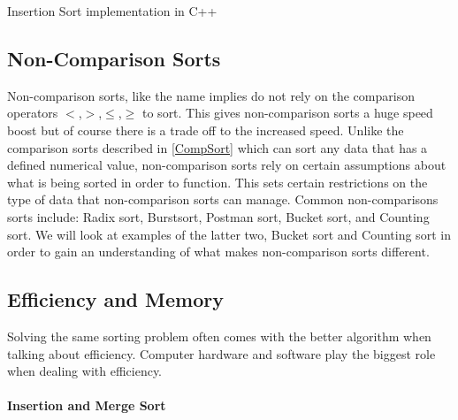 \documentclass[12pt]{article}
\begin{document}
	
	\begin{Snippet}[h]
		\caption[Insertion Sort]{Insertion Sort implementation in C++}	
		
		\label{snip:ins}
	\end{Snippet}
	
	
	
	\subsection{Non-Comparison Sorts}
	
	Non-comparison sorts, like the name implies do not rely on the comparison operators $<$,$>$,$\le$,$\ge$ to sort.
	This gives non-comparison sorts a huge speed boost but of course there is a trade off to the increased speed. 
	Unlike the comparison sorts described in \ref{CompSort} which can sort any data that has a defined numerical value, non-comparison sorts rely on certain assumptions about what is being sorted in order to function.
	This sets certain restrictions on the type of data that non-comparison sorts can manage.
	Common non-comparisons sorts include: Radix sort, Burstsort, Postman sort, Bucket sort, and Counting sort.
	We will look at examples of the latter two, Bucket sort and Counting sort  in order to gain an understanding of what makes non-comparison sorts different.

	
	\subsection{Efficiency and Memory}
	
	Solving the same sorting problem often comes with the better algorithm when talking about efficiency.
	Computer hardware and software play the biggest role when dealing with efficiency.
	
	\paragraph{Insertion and Merge Sort}
	
\end{document}
